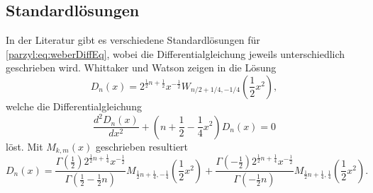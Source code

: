 \subsection{Standardlösungen}
In der Literatur gibt es verschiedene Standardlösungen für 
\eqref{parzyl:eq:weberDiffEq}, wobei die Differentialgleichung jeweils 
unterschiedlich geschrieben wird.
Whittaker und Watson zeigen in \cite{parzyl:whittaker} die Lösung
\begin{equation}
    D_n(x) = 2^{\frac{1}{2}n + \frac{1}{2}} x^{-\frac{1}{2}} W_{n/2 + 1/4, -1/4}\left(\frac{1}{2}x^2\right),
\end{equation}
welche die Differentialgleichung
\begin{equation}
    \frac{d^2D_n(x)}{dx^2} + \left(n + \frac{1}{2} - \frac{1}{4} x^2\right)D_n(x) = 0
\end{equation}
löst.
Mit $M_{k,m}(x)$ geschrieben resultiert
\begin{equation}
    D_n(x) = \frac{
            \Gamma \left( {\textstyle \frac{1}{2}}\right) 2^{\frac{1}{2}n + \frac{1}{4}} x^{-\frac{1}{2}}
        }{
            \Gamma \left( {\textstyle \frac{1}{2}} - {\textstyle \frac{1}{2}} n \right)
        }
        M_{\frac{1}{2} n + \frac{1}{4}, - \frac{1}{4}} \left(\frac{1}{2}x^2\right)
        +
        \frac{
            \Gamma\left(-{\textstyle \frac{1}{2}}\right) 2^{\frac{1}{2}n + \frac{1}{4}} x^{-\frac{1}{2}}
        }{
            \Gamma\left(- {\textstyle \frac{1}{2}} n\right)
        }
        M_{\frac{1}{2} n + \frac{1}{4}, \frac{1}{4}} \left(\frac{1}{2}x^2\right).
\end{equation}


